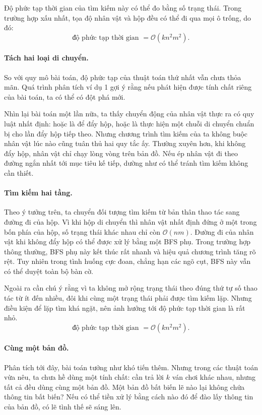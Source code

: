\documentclass[11pt]{article}
\newcommand{\Oh}{\mathcal{O}}
\begin{document}
Độ phức tạp thời gian của tìm kiếm này có thể đo bằng số trạng thái. Trong
trường hợp xấu nhất, tọa độ nhân vật và hộp đều có thể đi qua mọi ô trống, do
đó:
\[
  \text{độ phức tạp thời gian }=\Oh(kn^2m^2).
\]

\paragraph{Tách hai loại di chuyển.}
So với quy mô bài toán, độ phức tạp của thuật toán thứ nhất vẫn chưa thỏa
mãn. Quá trình phân tích ví dụ 1 gợi ý rằng nếu phát hiện được tính chất riêng
của bài toán, ta có thể có đột phá mới.

Nhìn lại bài toán một lần nữa, ta thấy chuyển động của nhân vật thực ra có
quy luật nhất định: hoặc là để đẩy hộp, hoặc là thực hiện một chuỗi di chuyển
chuẩn bị cho lần đẩy hộp tiếp theo. Nhưng chương trình tìm kiếm của ta không
buộc nhân vật lúc nào cũng tuân thủ hai quy tắc ấy. Thường xuyên hơn, khi
không đẩy hộp, nhân vật chỉ chạy lòng vòng trên bản đồ. Nếu ép nhân vật đi
theo đường ngắn nhất tới mục tiêu kế tiếp, dường như có thể tránh tìm kiếm
không cần thiết.

\paragraph{Tìm kiếm hai tầng.}
Theo ý tưởng trên, ta chuyển đối tượng tìm kiếm từ bản thân thao tác sang
đường đi của hộp. Vì khi hộp di chuyển thì nhân vật nhất định đứng ở một trong
bốn phía của hộp, số trạng thái khác nhau chỉ còn \(\Oh(nm)\). Đường đi của
nhân vật khi không đẩy hộp có thể được xử lý bằng một BFS phụ. Trong trường
hợp thông thường, BFS phụ này kết thúc rất nhanh và hiệu quả chương trình tăng
rõ rệt. Tuy nhiên trong tình huống cực đoan, chẳng hạn các ngõ cụt, BFS này
vẫn có thể duyệt toàn bộ bàn cờ.

Ngoài ra cần chú ý rằng vì ta không mở rộng trạng thái theo đúng thứ tự số
thao tác từ ít đến nhiều, đôi khi cùng một trạng thái phải được tìm kiếm lặp.
Nhưng điều kiện để lặp tìm khá ngặt, nên ảnh hưởng tới độ phức tạp thời gian
là rất nhỏ.
\[
  \text{độ phức tạp thời gian }=\Oh(kn^2m^2).
\]

\paragraph{Cùng một bản đồ.}
Phân tích tới đây, bài toán tưởng như khó tiến thêm. Nhưng trong các thuật
toán vừa nêu, ta chưa hề dùng một tính chất: cần trả lời \(k\) ván chơi khác
nhau, nhưng tất cả đều dùng cùng một bản đồ. Một bản đồ bất biến lẽ nào lại
không chứa thông tin bất biến? Nếu có thể tiền xử lý bằng cách nào đó để đào
lấy thông tin của bản đồ, có lẽ tình thế sẽ sáng lên.
\end{document}
